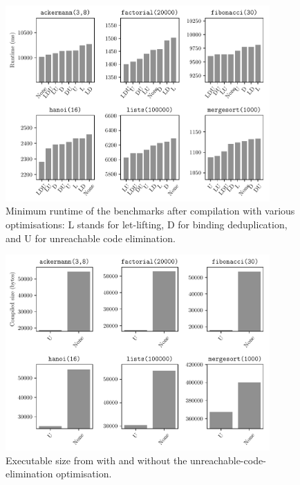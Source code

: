 \documentclass[dissertation.tex]{subfiles}
\begin{document}
{{        \begin{minipage}[t]{0.9\textwidth}
        \begin{figure}[H]
            \centering
            \captionsetup{width=0.8\textwidth}
            \includegraphics[width=0.9\textwidth]{graphs/perf_by_opt.pdf}
            \caption{Minimum runtime of the benchmarks after compilation with various optimisations: L stands for let-lifting, D for binding deduplication, and U for unreachable code elimination.}
            \label{fig:opt-perf}
        \end{figure}
        \begin{figure}[H]
            \centering
            \captionsetup{width=0.8\textwidth}
            \includegraphics[width=0.9\textwidth]{graphs/size_by_opt.pdf}
            \caption{Executable size from \compilername with and without the unreachable-code-elimination optimisation.}
            \label{fig:opt-size}
        \end{figure}
        \end{minipage}
    }
}
\end{document}
